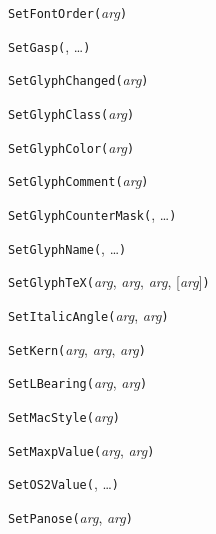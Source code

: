 
\noindent\texttt{SetFontOrder(}\textit{arg}\texttt{)}


\noindent\texttt{SetGasp(}, \ldots\texttt{)}


\noindent\texttt{SetGlyphChanged(}\textit{arg}\texttt{)}


\noindent\texttt{SetGlyphClass(}\textit{arg}\texttt{)}


\noindent\texttt{SetGlyphColor(}\textit{arg}\texttt{)}


\noindent\texttt{SetGlyphComment(}\textit{arg}\texttt{)}


\noindent\texttt{SetGlyphCounterMask(}, \ldots\texttt{)}


\noindent\texttt{SetGlyphName(}, \ldots\texttt{)}


\noindent\texttt{SetGlyphTeX(}\textit{arg}, \textit{arg}, \textit{arg}, [\textit{arg}]\texttt{)}


\noindent\texttt{SetItalicAngle(}\textit{arg}, \textit{arg}\texttt{)}


\noindent\texttt{SetKern(}\textit{arg}, \textit{arg}, \textit{arg}\texttt{)}


\noindent\texttt{SetLBearing(}\textit{arg}, \textit{arg}\texttt{)}


\noindent\texttt{SetMacStyle(}\textit{arg}\texttt{)}


\noindent\texttt{SetMaxpValue(}\textit{arg}, \textit{arg}\texttt{)}


\noindent\texttt{SetOS2Value(}, \ldots\texttt{)}


\noindent\texttt{SetPanose(}\textit{arg}, \textit{arg}\texttt{)}

